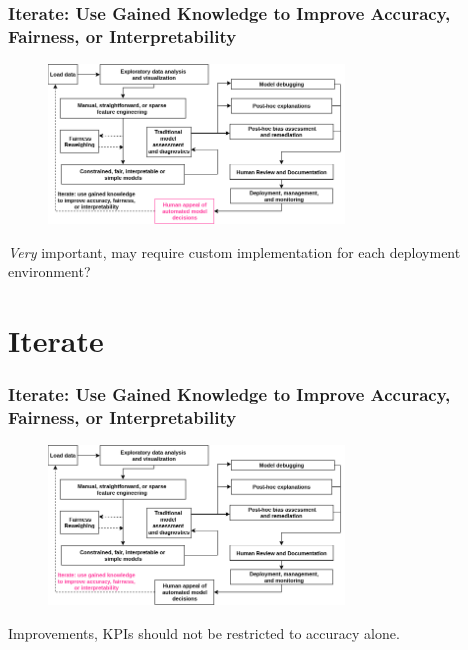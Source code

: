 \documentclass[11pt,
               aspectratio=169,
               hyperref={colorlinks}
               ]{beamer}
\begin{document}
		\begin{frame}	
			\frametitle{Iterate: Use Gained Knowledge to Improve Accuracy, Fairness, or Interpretability}		
			
			\begin{figure}[htb]
				\begin{center}
					\includegraphics[height=120pt]{img/ha.png}
					\label{fig:blueprint}
				\end{center}
			\end{figure}	

			\centering
			\vspace{-10pt}
			\textit{Very} important, may require custom implementation for each deployment environment?

		\end{frame}

	\section{Iterate}

		\begin{frame}	

			\frametitle{Iterate: Use Gained Knowledge to Improve Accuracy, Fairness, or Interpretability}		
			
			\begin{figure}[htb]
				\begin{center}
					\includegraphics[height=120pt]{img/iter.png}
					\label{fig:blueprint}
				\end{center}
			\end{figure}	

			\centering
			
			Improvements, KPIs should not be restricted to accuracy alone.
		
		\end{frame}
\end{document}
